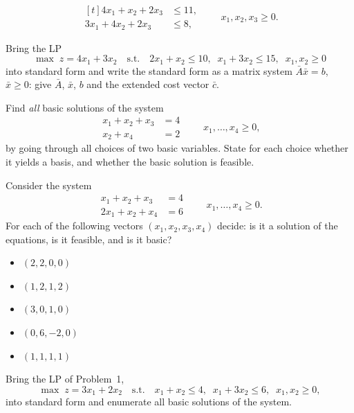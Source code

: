 \begin{problems}
\[\begin{aligned}[t]
            4x_{1}+x_{2}+2x_{3}&\le 11,\\
            3x_{1}+4x_{2}+2x_{3}&\le 8,
          \end{aligned}
          \qquad x_{1},x_{2},x_{3}\ge 0 .
        \]
  \item Bring the LP
        \[
          \max\; z=4x_{1}+3x_{2}
          \quad\text{s.t.}\quad
          2x_{1}+x_{2}\le 10,\;\;
          x_{1}+3x_{2}\le 15,\;\;
          x_{1},x_{2}\ge 0
        \]
        into standard form and write the standard form as a matrix system
        $\bar{A}\bar{x}=b$, $\bar{x}\ge 0$: give $\bar{A}$, $\bar{x}$, $b$
        and the extended cost vector $\bar{c}$.
  \item Find \emph{all} basic solutions of the system
        \[
          \begin{aligned}
            x_{1}+x_{2}+x_{3} &= 4\\
            x_{2}+x_{4} &= 2
          \end{aligned}
          \qquad x_{1},\dots,x_{4}\ge 0 ,
        \]
        by going through all choices of two basic variables. State for each
        choice whether it yields a basis, and whether the basic solution is
        feasible.
  \item Consider the system
        \[
          \begin{aligned}
            x_{1}+x_{2}+x_{3} &= 4\\
            2x_{1}+x_{2}+x_{4} &= 6
          \end{aligned}
          \qquad x_{1},\dots,x_{4}\ge 0 .
        \]
        For each of the following vectors $(x_{1},x_{2},x_{3},x_{4})$
        decide: is it a solution of the equations, is it feasible, and is
        it basic?
        \begin{itemize}[leftmargin=1.8em,itemsep=0.2ex]
          \item[(a)] $(2,2,0,0)$
          \item[(b)] $(1,2,1,2)$
          \item[(c)] $(3,0,1,0)$
          \item[(d)] $(0,6,-2,0)$
          \item[(e)] $(1,1,1,1)$
        \end{itemize}
  \item Bring the LP of Problem~1,
        \[
          \max\; z=3x_{1}+2x_{2}
          \quad\text{s.t.}\quad
          x_{1}+x_{2}\le 4,\;\;
          x_{1}+3x_{2}\le 6,\;\;
          x_{1},x_{2}\ge 0 ,
        \]
        into standard form and enumerate all basic solutions of the system.

\end{problems}
